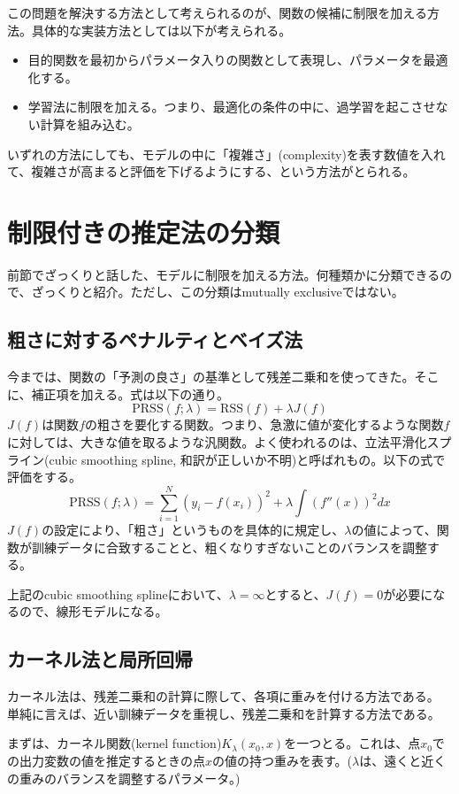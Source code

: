 \documentclass[uplatex]{jsarticle}
\begin{document}
この問題を解決する方法として考えられるのが、関数の候補に制限を加える方法。具体的な実装方法としては以下が考えられる。
\begin{itemize}
  \item 目的関数を最初からパラメータ入りの関数として表現し、パラメータを最適化する。
  \item 学習法に制限を加える。つまり、最適化の条件の中に、過学習を起こさせない計算を組み込む。
\end{itemize}
いずれの方法にしても、モデルの中に「複雑さ」(complexity)を表す数値を入れて、複雑さが高まると評価を下げるようにする、という方法がとられる。

\section{制限付きの推定法の分類}
前節でざっくりと話した、モデルに制限を加える方法。何種類かに分類できるので、ざっくりと紹介。ただし、この分類はmutually exclusiveではない。

\subsection{粗さに対するペナルティとベイズ法}
今までは、関数の「予測の良さ」の基準として残差二乗和を使ってきた。そこに、補正項を加える。式は以下の通り。
\[
  \mathrm{PRSS}(f;\lambda)=\mathrm{RSS}(f)+\lambda J(f)
\]
$J(f)$は関数$f$の粗さを要化する関数。つまり、急激に値が変化するような関数$f$に対しては、大きな値を取るような汎関数。よく使われるのは、立法平滑化スプライン(cubic smoothing spline, 和訳が正しいか不明)と呼ばれもの。以下の式で評価をする。
\[
  \mathrm{PRSS}(f;\lambda)=\sum_{i=1}^N(y_i-f(x_i))^2+\lambda\int(f''(x))^2dx
\]
$J(f)$の設定により、「粗さ」というものを具体的に規定し、$\lambda$の値によって、関数が訓練データに合致することと、粗くなりすぎないことのバランスを調整する。

上記のcubic smoothing splineにおいて、$\lambda=\infty$とすると、$J(f)=0$が必要になるので、線形モデルになる。

\subsection{カーネル法と局所回帰}
カーネル法は、残差二乗和の計算に際して、各項に重みを付ける方法である。
単純に言えば、近い訓練データを重視し、残差二乗和を計算する方法である。

まずは、カーネル関数(kernel function)$K_\lambda(x_0,x)$を一つとる。これは、点$x_0$での出力変数の値を推定するときの点$x$の値の持つ重みを表す。($\lambda$は、遠くと近くの重みのバランスを調整するパラメータ。)
\end{document}
